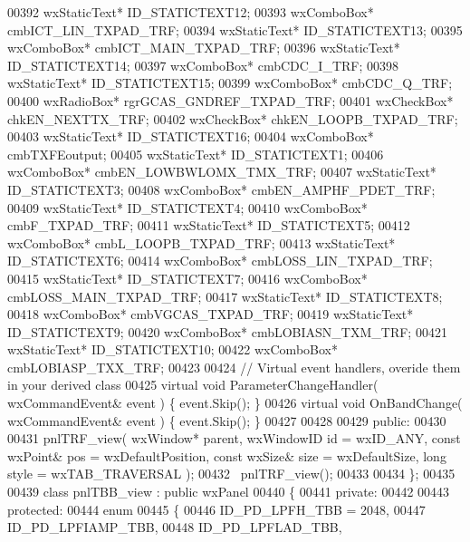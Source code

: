 \begin{DoxyCode}
00392         wxStaticText* ID_STATICTEXT12;
00393         wxComboBox* cmbICT_LIN_TXPAD_TRF;
00394         wxStaticText* ID_STATICTEXT13;
00395         wxComboBox* cmbICT_MAIN_TXPAD_TRF;
00396         wxStaticText* ID_STATICTEXT14;
00397         wxComboBox* cmbCDC_I_TRF;
00398         wxStaticText* ID_STATICTEXT15;
00399         wxComboBox* cmbCDC_Q_TRF;
00400         wxRadioBox* rgrGCAS_GNDREF_TXPAD_TRF;
00401         wxCheckBox* chkEN_NEXTTX_TRF;
00402         wxCheckBox* chkEN_LOOPB_TXPAD_TRF;
00403         wxStaticText* ID_STATICTEXT16;
00404         wxComboBox* cmbTXFEoutput;
00405         wxStaticText* ID_STATICTEXT1;
00406         wxComboBox* cmbEN_LOWBWLOMX_TMX_TRF;
00407         wxStaticText* ID_STATICTEXT3;
00408         wxComboBox* cmbEN_AMPHF_PDET_TRF;
00409         wxStaticText* ID_STATICTEXT4;
00410         wxComboBox* cmbF_TXPAD_TRF;
00411         wxStaticText* ID_STATICTEXT5;
00412         wxComboBox* cmbL_LOOPB_TXPAD_TRF;
00413         wxStaticText* ID_STATICTEXT6;
00414         wxComboBox* cmbLOSS_LIN_TXPAD_TRF;
00415         wxStaticText* ID_STATICTEXT7;
00416         wxComboBox* cmbLOSS_MAIN_TXPAD_TRF;
00417         wxStaticText* ID_STATICTEXT8;
00418         wxComboBox* cmbVGCAS_TXPAD_TRF;
00419         wxStaticText* ID_STATICTEXT9;
00420         wxComboBox* cmbLOBIASN_TXM_TRF;
00421         wxStaticText* ID_STATICTEXT10;
00422         wxComboBox* cmbLOBIASP_TXX_TRF;
00423         
00424         \textcolor{comment}{// Virtual event handlers, overide them in your derived class}
00425         \textcolor{keyword}{virtual} \textcolor{keywordtype}{void} ParameterChangeHandler( wxCommandEvent& event ) \{ \textcolor{keyword}{event}.Skip(); \}
00426         \textcolor{keyword}{virtual} \textcolor{keywordtype}{void} OnBandChange( wxCommandEvent& event ) \{ \textcolor{keyword}{event}.Skip(); \}
00427         
00428     
00429     \textcolor{keyword}{public}:
00430         
00431         pnlTRF_view( wxWindow* parent, wxWindowID \textcolor{keywordtype}{id} = wxID\_ANY, \textcolor{keyword}{const} wxPoint& pos = wxDefaultPosition, \textcolor{keyword}{
      const} wxSize& size = wxDefaultSize, \textcolor{keywordtype}{long} style = wxTAB\_TRAVERSAL ); 
00432         ~pnlTRF_view();
00433     
00434 \};
00435 
00439 \textcolor{keyword}{class }pnlTBB_view : \textcolor{keyword}{public} wxPanel 
00440 \{
00441     \textcolor{keyword}{private}:
00442     
00443     \textcolor{keyword}{protected}:
00444         \textcolor{keyword}{enum}
00445         \{
00446             ID\_PD\_LPFH\_TBB = 2048,
00447             ID_PD_LPFIAMP_TBB,
00448             ID_PD_LPFLAD_TBB,

\end{DoxyCode}
